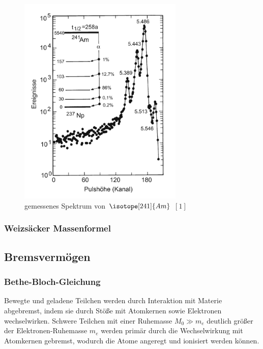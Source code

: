 \documentclass[12pt,a4paper]{scrartcl}
\numberwithin{equation}{section} %
\renewcommand{\[}{} %
\renewcommand{\]}{\noindent} %
\begin{document}
\begin{figure}
\centering
\includegraphics[width=0.7\textwidth]{../media/B3.3/Am241_Spektrum.pdf}
\caption{gemessenes Spektrum von \(\isotope [241]{Am}\) \([1]\)}
\end{figure}

\hypertarget{weizsuxe4cker-massenformel}{%
\subsubsection{Weizsäcker
Massenformel}\label{weizsuxe4cker-massenformel}}

\hypertarget{bremsvermuxf6gen}{%
\subsection{Bremsvermögen}\label{bremsvermuxf6gen}}

\hypertarget{bethe-bloch-gleichung}{%
\subsubsection{Bethe-Bloch-Gleichung}\label{bethe-bloch-gleichung}}

Bewegte und geladene Teilchen werden durch Interaktion mit Materie
abgebremst, indem sie durch Stöße mit Atomkernen sowie Elektronen
wechselwirken. Schwere Teilchen mit einer Ruhemasse \(M_0\gg m_e\)
deutlich größer der Elektronen-Ruhemasse \(m_e\) werden primär durch die
Wechselwirkung mit Atomkernen gebremst, wodurch die Atome angeregt und
ionisiert werden können.
\end{document}
